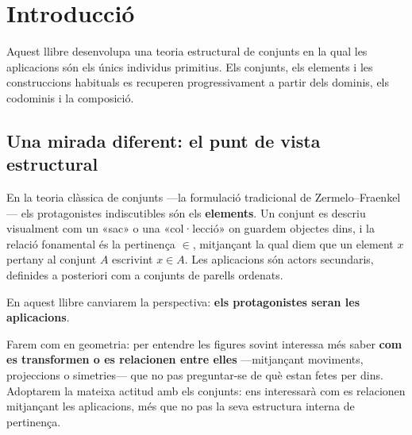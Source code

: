 \chapter*{Introducció}
\label{cap:introduccio}

Aquest llibre desenvolupa una teoria estructural de conjunts en la qual les aplicacions són els únics individus primitius. Els conjunts, els elements i les construccions habituals es recuperen progressivament a partir dels dominis, els codominis i la composició.


\section*{Una mirada diferent: el punt de vista estructural}

En la teoria clàssica de conjunts ---la formulació tradicional de
Zermelo--Fraenkel--- els protagonistes indiscutibles són els
\textbf{elements}. Un conjunt es descriu visualment com un «sac» o una
«col·lecció» on guardem objectes dins, i la relació fonamental és la pertinença \( \in \), mitjançant la qual diem que un element \(x\) pertany al conjunt \(A\) escrivint \(x \in A\). Les aplicacions són actors secundaris, definides a posteriori com a conjunts de parells ordenats.

En aquest llibre canviarem la perspectiva: \textbf{els
protagonistes seran les aplicacions}.

Farem com en geometria: per entendre les figures sovint interessa més
saber \textbf{com es transformen o es relacionen entre elles} ---mitjançant
moviments, projeccions o simetries--- que no pas preguntar-se de què estan
fetes per dins. Adoptarem la mateixa actitud amb els conjunts: ens
interessarà com es relacionen mitjançant les aplicacions, més que no pas
la seva estructura interna de pertinença.

